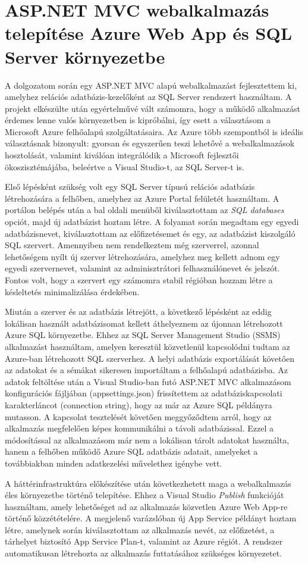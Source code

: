 \section{ASP.NET MVC webalkalmazás telepítése Azure Web App és SQL Server környezetbe}

A dolgozatom során egy ASP.NET MVC alapú webalkalmazást fejlesztettem ki, amelyhez relációs adatbázis-kezelőként az SQL Server rendszert használtam. A projekt elkészülte után egyértelművé vált számomra, hogy a működő alkalmazást érdemes lenne valós környezetben is kipróbálni, így esett a választásom a Microsoft Azure felhőalapú szolgáltatásaira. Az Azure több szempontból is ideális választásnak bizonyult: gyorsan és egyszerűen teszi lehetővé a webalkalmazások hosztolását, valamint kiválóan integrálódik a Microsoft fejlesztői ökoszisztémájába, beleértve a Visual Studio-t, az SQL Server-t is. 

Első lépésként szükség volt egy SQL Server típusú relációs adatbázis létrehozására a felhőben, amelyhez az Azure Portal felületét használtam. A portálon belépés után a bal oldali menüből kiválasztottam az \textit{SQL databases} opciót, majd új adatbázist hoztam létre. A folyamat során megadtam egy egyedi adatbázisnevet, kiválasztottam az előfizetésemet és egy, az adatbázist kiszolgáló SQL szervert. Amennyiben nem rendelkeztem még szerverrel, azonnal lehetőségem nyílt új szerver létrehozására, amelyhez meg kellett adnom egy egyedi szervernevet, valamint az adminisztrátori felhasználónevet és jelszót. Fontos volt, hogy a szervert egy számomra stabil régióban hozzam létre a késleltetés minimalizálása érdekében.

Miután a szerver és az adatbázis létrejött, a következő lépésként az eddig lokálisan használt adatbázisomat kellett áthelyeznem az újonnan létrehozott Azure SQL környezetbe. Ehhez az SQL Server Management Studio (SSMS) alkalmazást használtam, amelyen keresztül közvetlenül kapcsolódni tudtam az Azure-ban létrehozott SQL szerverhez. A helyi adatbázis exportálását követően az adatokat és a sémákat sikeresen importáltam a felhőalapú adatbázisba. Az adatok feltöltése után a Visual Studio-ban futó ASP.NET MVC alkalmazásom konfigurációs fájljában (appsettings.json) frissítettem az adatbáziskapcsolati karakterláncot (connection string), hogy az már az Azure SQL példányra mutasson. A kapcsolat tesztelését követően meggyőződtem arról, hogy az alkalmazás megfelelően képes kommunikálni a távoli adatbázissal. Ezzel a módosítással az alkalmazásom már nem a lokálisan tárolt adatokat használta, hanem a felhőben működő Azure SQL adatbázis adatait, amelyeket a továbbiakban minden adatkezelési művelethez igénybe vett.

A háttérinfrastruktúra előkészítése után következhetett maga a webalkalmazás éles környezetbe történő telepítése. Ehhez a Visual Studio \textit{Publish} funkcióját használtam, amely lehetőséget ad az alkalmazás közvetlen Azure Web App-re történő közzétételére. A megjelenő varázslóban új App Service példányt hoztam létre, amelynek során kiválasztottam az alkalmazás nevét, az előfizetést, a tárhelyet biztosító App Service Plan-t, valamint az Azure régiót. A rendszer automatikusan létrehozta az alkalmazás futtatásához szükséges környezetet.



